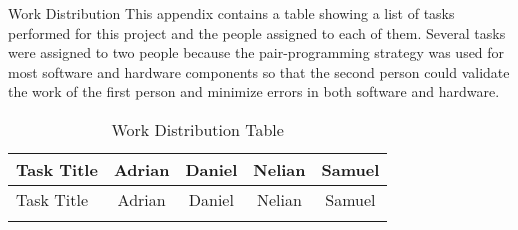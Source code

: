 \begin{customAppendixPage}{Work Distribution}
This appendix contains a table showing a list of tasks performed for this project and the people assigned to each of them.  Several tasks were assigned to two people because the pair-programming strategy was used for most software and hardware components so that the second person could validate the work of the first person and minimize errors in both software and hardware.
\end{customAppendixPage}
\renewcommand*{\thepage}{\thesection-\arabic{page}}



\begin{center}
\setlength{\extrarowheight}{1.5pt}
    \begin{longtable}{|m{3.25in}|c|c|c|c|}
    
    \caption{Work Distribution Table} \\
     \hline
    
    \centering Task Title     & Adrian & Daniel & Nelian & Samuel \\
    \hline \hline \endfirsthead
    
         \hline
    
     \centering Task Title     & Adrian & Daniel & Nelian & Samuel \\
    \hline \hline \endhead
    
    \endfoot


\end{longtable}
\end{center}
